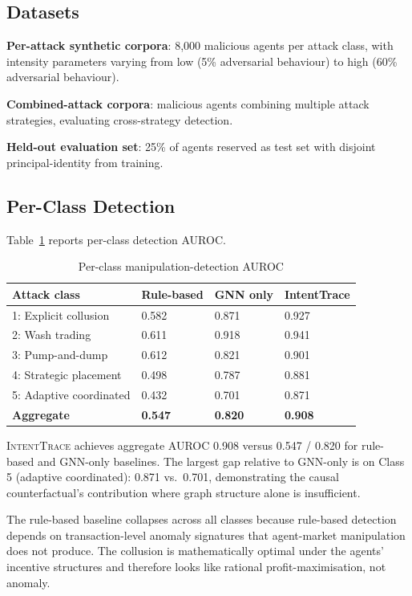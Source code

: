 \documentclass[sigconf,nonacm]{acmart}
\begin{document}
\subsection{Datasets}

\textbf{Per-attack synthetic corpora}: 8{,}000 malicious agents
per attack class, with intensity parameters varying from low (5\%
adversarial behaviour) to high (60\% adversarial behaviour).

\textbf{Combined-attack corpora}: malicious agents combining
multiple attack strategies, evaluating cross-strategy detection.

\textbf{Held-out evaluation set}: 25\% of agents reserved as test
set with disjoint principal-identity from training.

\subsection{Per-Class Detection}

Table~\ref{tab:perclass} reports per-class detection AUROC.

\begin{table}[h]
\caption{Per-class manipulation-detection AUROC}
\label{tab:perclass}
\small
\begin{tabularx}{\columnwidth}{@{}p{2.6cm}X X X@{}}
\toprule
\textbf{Attack class} & \textbf{Rule-based} & \textbf{GNN only} & \textbf{IntentTrace} \\
\midrule
1: Explicit collusion   & 0.582 & 0.871 & 0.927 \\
2: Wash trading         & 0.611 & 0.918 & 0.941 \\
3: Pump-and-dump        & 0.612 & 0.821 & 0.901 \\
4: Strategic placement  & 0.498 & 0.787 & 0.881 \\
5: Adaptive coordinated & 0.432 & 0.701 & 0.871 \\
\midrule
\textbf{Aggregate}      & \textbf{0.547} & \textbf{0.820} & \textbf{0.908} \\
\bottomrule
\end{tabularx}
\end{table}

\textsc{IntentTrace} achieves aggregate AUROC 0.908 versus 0.547 /
0.820 for rule-based and GNN-only baselines. The largest gap
relative to GNN-only is on Class 5 (adaptive coordinated): 0.871
vs.\ 0.701, demonstrating the causal counterfactual's contribution
where graph structure alone is insufficient.

The rule-based baseline collapses across all classes because rule-based
detection depends on transaction-level anomaly signatures that
agent-market manipulation does not produce. The collusion is
mathematically optimal under the agents' incentive structures and
therefore looks like rational profit-maximisation, not anomaly.
\end{document}
